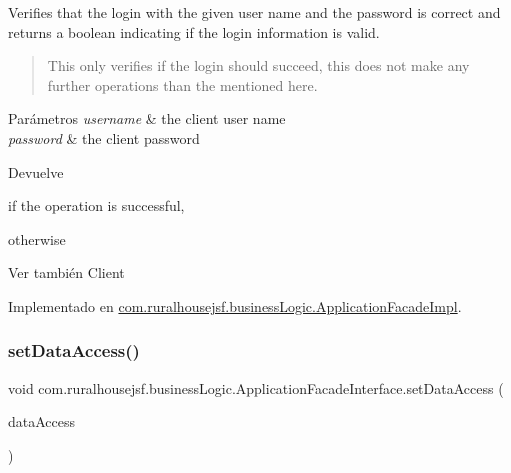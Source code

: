 Verifies that the login with the given user name and the password is correct and returns a boolean indicating if the login information is valid. \begin{quote}
This only verifies if the login should succeed, this does not make any further operations than the mentioned here. \end{quote}



\begin{DoxyParams}{Parámetros}
{\em username} & the client user name \\
\hline
{\em password} & the client password\\
\hline
\end{DoxyParams}
\begin{DoxyReturn}{Devuelve}

\begin{DoxyCode}{0}
\DoxyCodeLine{\textcolor{keyword}{true} }
\end{DoxyCode}
 if the operation is successful,
\begin{DoxyCode}{0}
\DoxyCodeLine{\textcolor{keyword}{false} }
\end{DoxyCode}
 otherwise
\end{DoxyReturn}
\begin{DoxySeeAlso}{Ver también}
Client 
\end{DoxySeeAlso}


Implementado en \mbox{\hyperlink{classcom_1_1ruralhousejsf_1_1business_logic_1_1_application_facade_impl_a7af883dece6a0de1e1be2b83e3d4a23f}{com.\+ruralhousejsf.\+business\+Logic.\+Application\+Facade\+Impl}}.

\mbox{\label{interfacecom_1_1ruralhousejsf_1_1business_logic_1_1_application_facade_interface_a8bb95aa007a4d95b32ed838ae40406c0}} 
\subsubsection{\texorpdfstring{setDataAccess()}{setDataAccess()}}
{\footnotesize\ttfamily void com.\+ruralhousejsf.\+business\+Logic.\+Application\+Facade\+Interface.\+set\+Data\+Access (\begin{DoxyParamCaption}\item[{\mbox{\hyperlink{interfacecom_1_1ruralhousejsf_1_1data_access_1_1_hibernate_data_access_interface}{Hibernate\+Data\+Access\+Interface}}}]{data\+Access }\end{DoxyParamCaption})}

